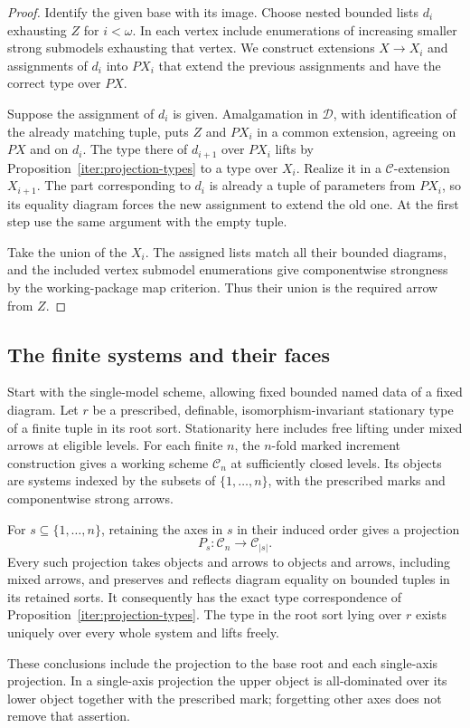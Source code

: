 \begin{proof}
Identify the given base with its image. Choose nested bounded
lists $d_i$ exhausting $Z$ for $i<\omega$. In each vertex include
enumerations of increasing smaller strong submodels exhausting
that vertex. We construct extensions $X\to X_i$ and assignments
of $d_i$ into $PX_i$ that extend the previous assignments and
have the correct type over $PX$.

Suppose the assignment of $d_i$ is given. Amalgamation in
$\mathcal D$, with identification of the already matching tuple,
puts $Z$ and $PX_i$ in a common extension, agreeing on $PX$ and
on $d_i$. The type there of $d_{i+1}$ over $PX_i$ lifts by
Proposition~\ref{iter:projection-types} to a type over $X_i$.
Realize it in a $\mathcal C$-extension $X_{i+1}$. The part
corresponding to $d_i$ is already a tuple of parameters from
$PX_i$, so its equality diagram forces the new assignment to
extend the old one. At the first step use the same argument with
the empty tuple.

Take the union of the $X_i$. The assigned lists match all their
bounded diagrams, and the included vertex submodel enumerations
give componentwise strongness by the working-package map
criterion. Thus their union is the required arrow from $Z$.
\end{proof}

\subsection{The finite systems and their faces}

\begin{theorem}
\label{iter:finite-systems}
Start with the single-model scheme, allowing fixed bounded named
data of a fixed diagram. Let $r$ be a prescribed, definable,
isomorphism-invariant stationary type of a finite tuple in its
root sort. Stationarity here includes free lifting under mixed
arrows at eligible levels. For each finite $n$, the $n$-fold marked
increment construction gives a working scheme $\mathcal C_n$
at sufficiently closed levels. Its objects are systems indexed
by the subsets of $\{1,\ldots,n\}$, with the prescribed marks
and componentwise strong arrows.

For $s\subseteq\{1,\ldots,n\}$, retaining the axes in $s$
in their induced order gives a projection
\[
 P_s:\mathcal C_n\longrightarrow\mathcal C_{|s|}.
\]
Every such projection takes objects and arrows to objects and
arrows, including mixed arrows, and preserves and reflects
diagram equality on bounded tuples in its retained sorts.
It consequently has the exact type correspondence of
Proposition~\ref{iter:projection-types}. The type in the root
sort lying over $r$ exists uniquely over every whole system and
lifts freely.

These conclusions include the projection to the base root and
each single-axis projection. In a single-axis projection the
upper object is all-dominated over its lower object together
with the prescribed mark; forgetting other axes does not remove
that assertion.
\end{theorem}

